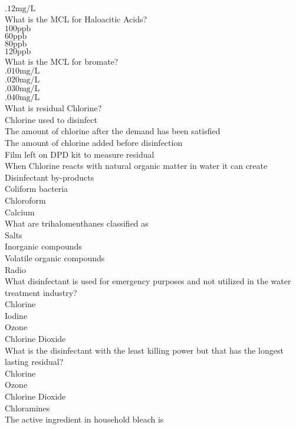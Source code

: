 $.12 \mathrm{mg} / \mathrm{L}$\\
 What is the MCL for Haloacitic Acids?\\
$100 \mathrm{ppb}$\\
$60 \mathrm{ppb}$\\
$80 \mathrm{ppb}$\\
$120 \mathrm{ppb}$\\
What is the $\mathrm{MCL}$ for bromate?\\
$.010 \mathrm{mg} / \mathrm{L}$\\
$.020 \mathrm{mg} / \mathrm{L}$\\
$.030 \mathrm{mg} / \mathrm{L}$\\
$.040 \mathrm{mg} / \mathrm{L}$\\
What is residual Chlorine?\\
Chlorine used to disinfect\\
The amount of chlorine after the demand has been satisfied\\
The amount of chlorine added before disinfection\\
Film left on DPD kit to measure residual\\
 When Chlorine reacts with natural organic matter in water it can create\\
Disinfectant by-products\\
Coliform bacteria\\
Chloroform\\
Calcium\\
 What are trihalomenthanes classified as\\
Salts\\
Inorganic compounds\\
Volatile organic compounds\\
Radio\\
 What disinfectant is used for emergency purposes and not utilized in the water treatment industry?\\
Chlorine\\
Iodine\\
Ozone\\
Chlorine Dioxide\\
 What is the disinfectant with the least killing power but that has the longest lasting residual?\\
Chlorine\\
Ozone\\
Chlorine Dioxide\\
Chloramines\\
 The active ingredient in household bleach is\\
